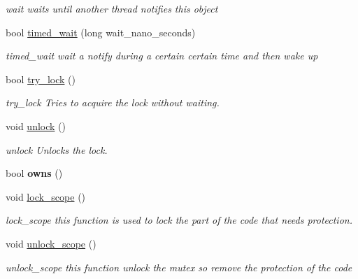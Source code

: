 \begin{DoxyCompactItemize}
\begin{DoxyCompactList}\small\item\em wait waits until another thread notifies this object \end{DoxyCompactList}\item 
bool \hyperlink{classshared__memory_1_1LockedConditionVariable_a0d4ab218fc51fcce34146f2adca408d7}{timed\+\_\+wait} (long wait\+\_\+nano\+\_\+seconds)
\begin{DoxyCompactList}\small\item\em timed\+\_\+wait wait a notify during a certain certain time and then wake up \end{DoxyCompactList}\item 
bool \hyperlink{classshared__memory_1_1LockedConditionVariable_a86b42b23b94593bca5b12b9d792d1275}{try\+\_\+lock} ()
\begin{DoxyCompactList}\small\item\em try\+\_\+lock Tries to acquire the lock without waiting. \end{DoxyCompactList}\item 
void \hyperlink{classshared__memory_1_1LockedConditionVariable_a5d28bb5942fc5bc4886014d6b9b26885}{unlock} ()
\begin{DoxyCompactList}\small\item\em unlock Unlocks the lock. \end{DoxyCompactList}\item 
bool {\bfseries owns} ()\hypertarget{classshared__memory_1_1LockedConditionVariable_a30e3825249516387276801f8d2e68a8e}{}\label{classshared__memory_1_1LockedConditionVariable_a30e3825249516387276801f8d2e68a8e}

\item 
void \hyperlink{classshared__memory_1_1LockedConditionVariable_a1eef63f7e3e898c3734923c987383ffe}{lock\+\_\+scope} ()
\begin{DoxyCompactList}\small\item\em lock\+\_\+scope this function is used to lock the part of the code that needs protection. \end{DoxyCompactList}\item 
void \hyperlink{classshared__memory_1_1LockedConditionVariable_adf3a50665011b3b92b80369bbbc6d4a4}{unlock\+\_\+scope} ()\hypertarget{classshared__memory_1_1LockedConditionVariable_adf3a50665011b3b92b80369bbbc6d4a4}{}\label{classshared__memory_1_1LockedConditionVariable_adf3a50665011b3b92b80369bbbc6d4a4}

\begin{DoxyCompactList}\small\item\em unlock\+\_\+scope this function unlock the mutex so remove the protection of the code \end{DoxyCompactList}\end{DoxyCompactItemize}
